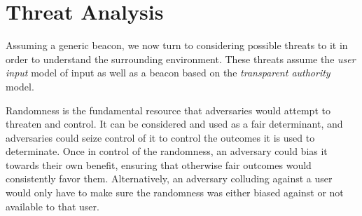 \section{Threat Analysis}
Assuming a generic beacon, we now turn to considering possible threats to it in order to understand the surrounding environment.
These threats assume the \emph{user input} model of input as well as a beacon based on the \emph{transparent authority} model.

Randomness is the fundamental resource that adversaries would attempt to threaten and control. It can be considered and used as a fair determinant, and adversaries could seize control of it to control the outcomes it is used to determinate. Once in control of the randomness, an adversary could bias it towards their own benefit, ensuring that otherwise fair outcomes would consistently favor them. Alternatively, an adversary colluding against a user would only have to make sure the randomness was either biased against or not available to that user.
